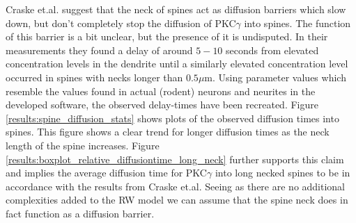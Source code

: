 Craske et.al. suggest that the neck of spines act as diffusion barriers which slow down, but don't completely stop the diffusion of PKC$\gamma$ into spines. 
The function of this barrier is a bit unclear, but the presence of it is undisputed. 
In their measurements they found a delay of around $5-10$ seconds from elevated concentration levels in the dendrite until a similarly elevated concentration level occurred in spines with necks longer than $0.5\mu$m. 
Using parameter values which resemble the values found in actual (rodent) neurons and neurites in the developed software, the observed delay-times have been recreated. 
Figure \ref{results:spine_diffusion_stats} shows plots of the observed diffusion times into spines. 
This figure shows a clear trend for longer diffusion times as the neck length of the spine increases. 
Figure \ref{results:boxplot_relative_diffusiontime_long_neck} further supports this claim and implies the average diffusion time for PKC$\gamma$ into long necked spines to be in accordance with the results from Craske et.al.
Seeing as there are no additional complexities added to the RW model we can assume that the spine neck does in fact function as a diffusion barrier.

